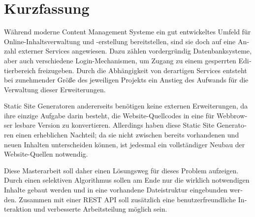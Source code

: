 \chapter{Kurzfassung}

\begin{german}
Während moderne Content Management Systeme ein gut entwickeltes Umfeld für Online-Inhaltsverwaltung und -erstellung bereitstellen, sind sie doch auf eine Anzahl externer Services angewiesen. Dazu zählen vordergründig Datenbanksysteme, aber auch verschiedene Login-Mechanismen, um Zugang zu einem gesperrten Editierbereich freizugeben. Durch die Abhängigkeit von derartigen Services entsteht bei zunehmender Größe des jeweiligen Projekts ein Anstieg des Aufwands für die Verwaltung dieser Erweiterungen.

Static Site Generatoren andererseits benötigen keine externen Erweiterungen, da ihre einzige Aufgabe darin besteht, die Website-Quellcodes in eine für Webbrowser lesbare Version zu konvertieren. Allerdings haben diese Static Site Generatoren einen erheblichen Nachteil; da sie nicht zwischen bereits vorhandenen und neuen Inhalten unterscheiden können, ist jedesmal ein vollständiger Neubau der Website-Quellen notwendig.

Diese Masterarbeit soll daher einen Lösungsweg für dieses Problem aufzeigen. Durch einen selektiven Algorithmus sollen am Ende nur die wirklich notwendigen Inhalte gebaut werden und in eine vorhandene Dateistruktur eingebunden werden. Zusammen mit einer REST API soll zusätzlich eine benutzerfreundliche Interaktion und verbesserte Arbeitsteilung möglich sein.
\end{german}
